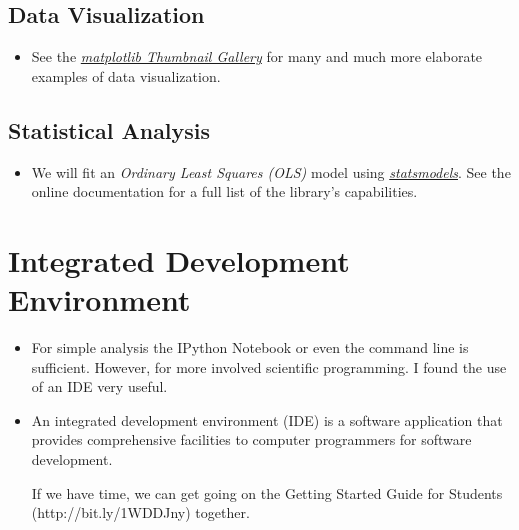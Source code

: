 \subsection{Data Visualization }
\begin{itemize}
\item See the \href{http://matplotlib.org/gallery.html}{\textit{matplotlib Thumbnail Gallery}} for many and much more elaborate examples of data visualization.
\end{itemize}
\subsection{Statistical Analysis}
\begin{itemize}
\item We will fit an \textit{Ordinary Least Squares (OLS)} model using \href{http://statsmodels.sourceforge.net}{\textit{statsmodels}}. See the online documentation for a full list of the library's capabilities.
\end{itemize}
\section{Integrated Development Environment}
\begin{itemize}
\item For simple analysis the IPython Notebook or even the command line is sufficient. However, for more involved scientific programming. I found the use of an IDE very useful.
\item An integrated development environment (IDE) is a software application that provides comprehensive facilities to computer programmers for software development.

If we have time, we can get going on the Getting Started Guide for Students (http://bit.ly/1WDDJny) together. 
\end{itemize}



